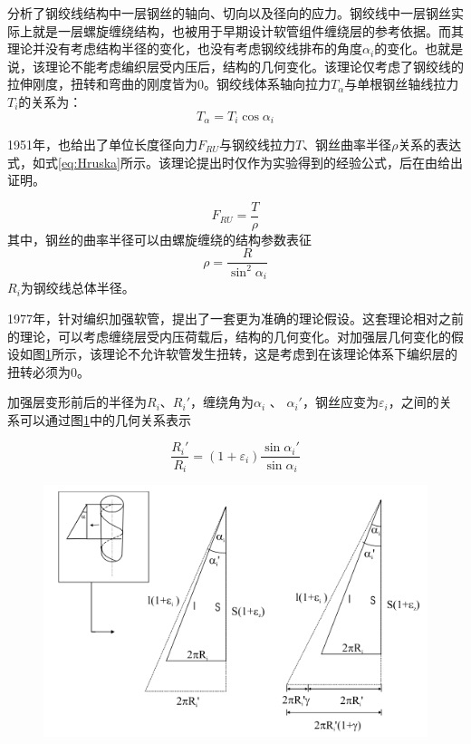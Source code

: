 \citeauthor{hruska1951calculation}\cite{hruska1951calculation,hruska1952radial,hruska1953tangential}分析了钢绞线结构中一层钢丝的轴向、切向以及径向的应力。钢绞线中一层钢丝实际上就是一层螺旋缠绕结构，也被用于早期设计软管组件缠绕层的参考依据。而其理论并没有考虑结构半径的变化，也没有考虑钢绞线排布的角度$ \alpha_i $的变化。也就是说，该理论不能考虑编织层受内压后，结构的几何变化。该理论仅考虑了钢绞线的拉伸刚度，扭转和弯曲的刚度皆为0。钢绞线体系轴向拉力$ T_\alpha $与单根钢丝轴线拉力$ T_i $的关系为：
\begin{equation}
T_\alpha = T_i \cos{\alpha_i}
\end{equation}

1951年，\citeauthor{hruska1951calculation}也给出了单位长度径向力$ F_{RU} $与钢绞线拉力$ T $、钢丝曲率半径$ \rho $关系的表达式，如式\ref{eq:Hruska}所示。该理论提出时仅作为实验得到的经验公式，后在\citeyear{machida1973}由\citeauthor{machida1973}给出证明。

\begin{equation}\label{eq:Hruska}
{F_{RU}} = \frac{T}{\rho }
\end{equation}
其中，钢丝的曲率半径可以由螺旋缠绕的结构参数表征
\begin{equation}
\rho  = \frac{R}{{{{\sin }^2}{\alpha _i}}}
\end{equation}
$ R_i $为钢绞线总体半径。


1977年，\citeauthor{Entwistle1977}\cite{Entwistle1977}针对编织加强软管，提出了一套更为准确的理论假设。这套理论相对之前的理论，可以考虑缠绕层受内压荷载后，结构的几何变化。\citeauthor{Entwistle1977}对加强层几何变化的假设如图\ref{fig:assumption-deformed-geometry}所示，该理论不允许软管发生扭转，这是考虑到在该理论体系下编织层的扭转必须为0。

加强层变形前后的半径为$ R_i $、$ R_i' $，缠绕角为$ \alpha_i$ 、 $\alpha_i' $，钢丝应变为$ \varepsilon_i $，之间的关系可以通过图\ref{fig:assumption-deformed-geometry}中的几何关系表示

\begin{equation}
\frac{{{R_i}'}}{{{R_i}}} = \left( {1 + {\varepsilon _i}} \right)\frac{{\sin {\alpha _i}'}}{{\sin {\alpha _i}}}
\end{equation}

\begin{figure}[!htbp]
	\centering
		\includegraphics[width=0.7\linewidth]{figure/chap3/review/a}
	\label{fig:assumption-deformed-geometry}
\end{figure}


